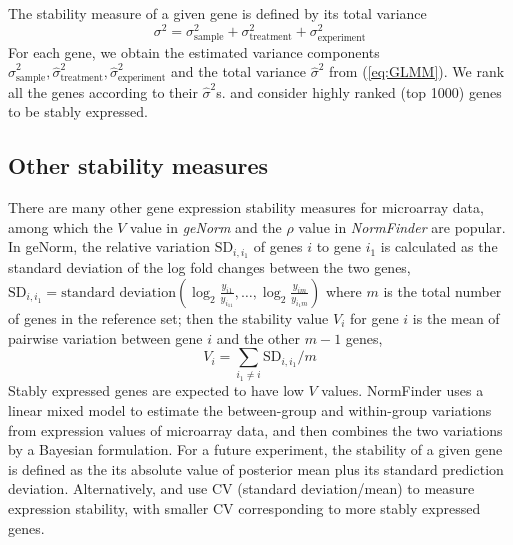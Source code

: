 \documentclass[11pt, a4paper]{article}
\begin{document}
The stability measure of a given gene is defined by its total variance
 \begin{equation}\label{eq:totalVariance}
 \sigma^2 =\sigma_{\text{sample}}^2+ \sigma_{\text{treatment}}^2+ \sigma_{\text{experiment}}^2
 \end{equation}
For each gene, we obtain the estimated variance components $\hat\sigma_{\text{sample}}^2,  \hat\sigma_{\text{treatment}}^2,  \hat\sigma_{\text{experiment}}^2$ and the total variance $\hat\sigma^2$ from (\ref{eq:GLMM}).
We rank all the genes according to their $\hat\sigma^2$s. and consider highly ranked (top 1000) genes to be stably expressed. 

\subsection{Other stability measures}\label{subsection:OtherStabilityMeasure}
There are many other gene expression stability measures for microarray data, among which the $V$ value in \textit{geNorm} \citep{vandesompele2002accurate} and the $\rho$ value in \textit{NormFinder} \citep{andersen2004normalization} are popular. In geNorm, the relative variation $\text{SD}_{i, i_1}$ of genes $i$ to gene $i_1$ is calculated as the standard deviation of the log fold changes between the two genes, $\text{SD}_{i, i_1} = \text{standard deviation}(\log_2 \frac{y_{i1}}{y_{i_11}}, \ldots, \log_2 \frac{y_{im}}{y_{i_1m}})$ where $m$ is the total number of genes in the reference set; then the stability value $V_i$ for gene $i$ is the mean of pairwise variation between gene $i$ and the other $m-1$ genes, 
\begin{equation}\label{eq:vvalue}
V_i = \sum_{i_1 \neq i}\text{SD}_{i, i_1}/m
\end{equation}
Stably expressed genes are expected to have low $V$ values. NormFinder uses a linear mixed model to estimate the between-group and within-group variations from expression values of microarray data, and then combines the two variations by a Bayesian formulation. For a future experiment, the stability of a given gene is defined as the its absolute value of posterior mean plus its standard prediction deviation. Alternatively, \cite{czechowski2005genome} and \cite{dekkers2012identification} use CV (standard deviation/mean) to measure expression stability, with smaller CV  corresponding to more stably expressed genes.
	
\end{document}
